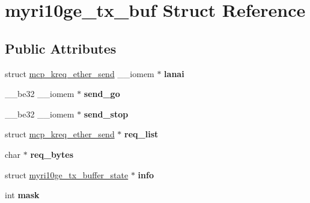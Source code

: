 \hypertarget{structmyri10ge__tx__buf}{
\section{myri10ge\_\-tx\_\-buf Struct Reference}
\label{structmyri10ge__tx__buf}
}
\subsection*{Public Attributes}
\begin{DoxyCompactItemize}
\item 
\hypertarget{structmyri10ge__tx__buf_a998f3c76c2a8c19556e9c7d502ea17aa}{
struct \hyperlink{structmcp__kreq__ether__send}{mcp\_\-kreq\_\-ether\_\-send} \_\-\_\-iomem $\ast$ {\bfseries lanai}}
\label{structmyri10ge__tx__buf_a998f3c76c2a8c19556e9c7d502ea17aa}

\item 
\hypertarget{structmyri10ge__tx__buf_a7a94891e2cf4329d85b96df094c11191}{
\_\-\_\-be32 \_\-\_\-iomem $\ast$ {\bfseries send\_\-go}}
\label{structmyri10ge__tx__buf_a7a94891e2cf4329d85b96df094c11191}

\item 
\hypertarget{structmyri10ge__tx__buf_a50c86325a9fbe08f92670340495de0a5}{
\_\-\_\-be32 \_\-\_\-iomem $\ast$ {\bfseries send\_\-stop}}
\label{structmyri10ge__tx__buf_a50c86325a9fbe08f92670340495de0a5}

\item 
\hypertarget{structmyri10ge__tx__buf_a44f528ef4073348e0c44dd9c8e6a5a79}{
struct \hyperlink{structmcp__kreq__ether__send}{mcp\_\-kreq\_\-ether\_\-send} $\ast$ {\bfseries req\_\-list}}
\label{structmyri10ge__tx__buf_a44f528ef4073348e0c44dd9c8e6a5a79}

\item 
\hypertarget{structmyri10ge__tx__buf_aef74efc11786401b24dec3264bb47fe4}{
char $\ast$ {\bfseries req\_\-bytes}}
\label{structmyri10ge__tx__buf_aef74efc11786401b24dec3264bb47fe4}

\item 
\hypertarget{structmyri10ge__tx__buf_a6deb18c2f2296d140b76bfab784cdce0}{
struct \hyperlink{structmyri10ge__tx__buffer__state}{myri10ge\_\-tx\_\-buffer\_\-state} $\ast$ {\bfseries info}}
\label{structmyri10ge__tx__buf_a6deb18c2f2296d140b76bfab784cdce0}

\item 
\hypertarget{structmyri10ge__tx__buf_a6dd9715ef986f89b879e42f832ad57a6}{
int {\bfseries mask}}
\label{structmyri10ge__tx__buf_a6dd9715ef986f89b879e42f832ad57a6}


\end{DoxyCompactItemize}
